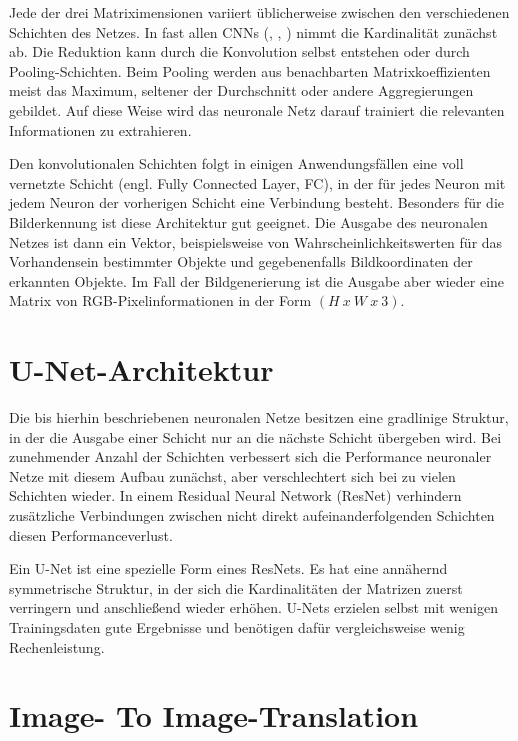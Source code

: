 Jede der drei Matriximensionen variiert üblicherweise zwischen den verschiedenen Schichten des Netzes. In fast allen CNNs (\cite{Goodfellow-et-al-2016}, \cite{RFB15a}, \cite{isola2018imagetoimage}) nimmt die Kardinalität zunächst ab. Die Reduktion kann durch die Konvolution selbst entstehen oder durch Pooling-Schichten. Beim Pooling werden aus benachbarten Matrixkoeffizienten meist das Maximum, seltener der Durchschnitt oder andere Aggregierungen gebildet. Auf diese Weise wird das neuronale Netz darauf trainiert die relevanten Informationen zu extrahieren. \cite{Goodfellow-et-al-2016}

Den konvolutionalen Schichten folgt in einigen Anwendungsfällen eine voll vernetzte Schicht (engl. Fully Connected Layer, FC), in der für jedes Neuron mit jedem Neuron der vorherigen Schicht eine Verbindung besteht. Besonders für die Bilderkennung ist diese Architektur gut geeignet. Die Ausgabe des neuronalen Netzes ist dann ein Vektor, beispielsweise von Wahrscheinlichkeitswerten für das Vorhandensein bestimmter Objekte und gegebenenfalls Bildkoordinaten der erkannten Objekte. Im Fall der Bildgenerierung ist die Ausgabe aber wieder eine Matrix von RGB-Pixelinformationen in der Form $(H\ x\ W\ x\ 3)$.

\section{U-Net-Architektur}
\label{sec:unet}
Die bis hierhin beschriebenen neuronalen Netze besitzen eine gradlinige Struktur, in der die Ausgabe einer Schicht nur an die nächste Schicht übergeben wird. Bei zunehmender Anzahl der Schichten verbessert sich die Performance neuronaler Netze mit diesem Aufbau zunächst, aber verschlechtert sich bei zu vielen Schichten wieder. In einem Residual Neural Network (ResNet) verhindern zusätzliche Verbindungen zwischen nicht direkt aufeinanderfolgenden Schichten diesen Performanceverlust.

Ein U-Net ist eine spezielle Form eines ResNets. Es hat eine annähernd symmetrische Struktur, in der sich die Kardinalitäten der Matrizen zuerst verringern und anschließend wieder erhöhen. U-Nets erzielen selbst mit wenigen Trainingsdaten gute Ergebnisse und benötigen dafür vergleichsweise wenig Rechenleistung. \cite{he2015deep}

\section{Image- To Image-Translation}
\label{sec:nst}



